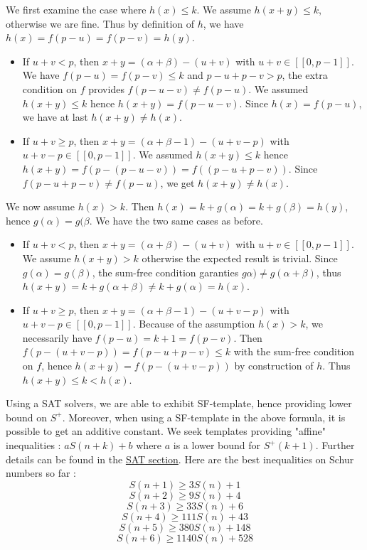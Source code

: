 We first examine the case where \(h(x) \leqslant k\). We assume \(h(x+y) \leqslant k\), otherwise we are fine. 
Thus by definition of \(h\), we have \(h(x) = f(p-u) = f(p-v) = h(y)\).
\begin{itemize}
\item If \(u+v < p\), then \(x+y = (\alpha+\beta) - (u+v) \) with \(u+v \in [\![0,p-1]\!] \).
We have \(f(p-u) = f(p-v)  \leqslant k\) and \(p-u + p-v > p\), the extra condition on \(f\) provides \(f(p-u-v) \neq f(p-u)\).
We assumed \(h(x+y) \leqslant k\) hence \(h(x+y) = f(p-u-v)\). Since \(h(x) = f(p-u)\), we have at last \(h(x+y) \neq h(x)\).
\item If \(u+v \geqslant p\), then \(x+y = (\alpha+\beta-1) - (u+v-p) \) with \(u+v-p \in [\![0,p-1]\!] \).
We assumed \(h(x+y) \leqslant k \) hence \(h(x+y) = f( p- (p-u-v)) = f((p-u + p-v))\). Since \(f(p-u+p-v) \neq f(p-u)\),
we get \(h(x+y) \neq h(x)\).
\end{itemize} 
  
We now assume \(h(x) > k\). Then \(h(x) = k + g(\alpha) = k + g(\beta) = h(y)\), hence \(g(\alpha) = g(\beta\). 
We have the two same cases as before.

\begin{itemize}
\item If \(u+v < p\), then \(x+y = (\alpha+\beta) - (u+v) \) with \(u+v \in [\![0,p-1]\!] \).
We assume \(h(x+y) > k\) otherwise the expected result is trivial.
Since \(g(\alpha) = g(\beta)\), the sum-free condition garanties \(g\alpha) \neq g(\alpha+\beta)\), 
thus \(h(x+y) = k + g(\alpha + \beta) \neq k + g(\alpha) = h(x)\).
\item If \(u+v \geqslant p\), then \(x+y = (\alpha+\beta-1) - (u+v-p) \) with \(u+v-p \in [\![0,p-1]\!] \).
Because of the assumption \(h(x) > k\), we necessarily have \(f(p-u) = k+1 = f(p-v)\). 
Then \(f(p-(u+v-p)) = f(p-u + p-v) \leqslant k \) with the sum-free condition on \(f\), 
hence \(h(x+y) = f(p-(u+v-p)) \) by construction of \(h\). Thus \(h(x+y) \leqslant k < h(x)\).
\end{itemize}


Using a SAT solvers, we are able to exhibit SF-template,
hence providing lower bound on \(S^+\). Moreover, when using
a SF-template in the above formula, it is possible to get an additive constant. We seek templates providing "affine"
inequalities : \(aS(n+k) + b \) where \(a\) is a lower bound for \(S^+(k+1)\). Further details can be found in the
\hyperref[SAT]{SAT section}.
Here are the best inequalities on Schur numbers so far :
\[ S(n+1) \geqslant 3S(n) + 1 \]
\[ S(n+2) \geqslant 9S(n) + 4 \]
\[ S(n+3) \geqslant 33S(n) + 6 \]
\[ S(n+4) \geqslant 111S(n) + 43 \]
\[ S(n+5) \geqslant 380S(n) + 148 \]
\[ S(n+6) \geqslant 1140S(n) + 528 \]

